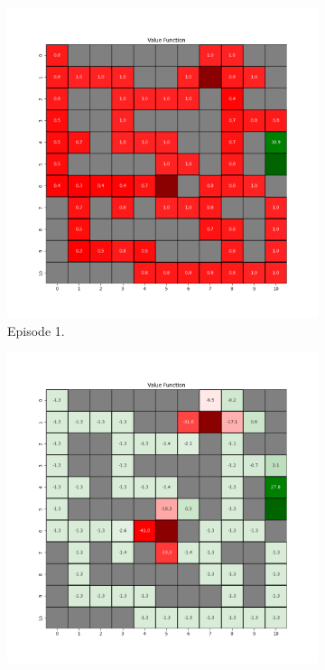 \documentclass{assignment}
\begin{document}
\begin{figure}[H]
    \begin{subfigure}{0.3\textwidth}
        \includegraphics[width=\textwidth]{figures/value_td/gamma_sweep/value_function_alpha_0.1_gamma_0.25_epsilon_0.2_iteration_1.png}
    \caption{Episode 1.}
    \end{subfigure}\hfill
    \begin{subfigure}{0.3\textwidth}
        \includegraphics[width=\textwidth]{figures/value_td/gamma_sweep/value_function_alpha_0.1_gamma_0.25_epsilon_0.2_iteration_50.png}

\end{subfigure}
\end{figure}
\end{document}
